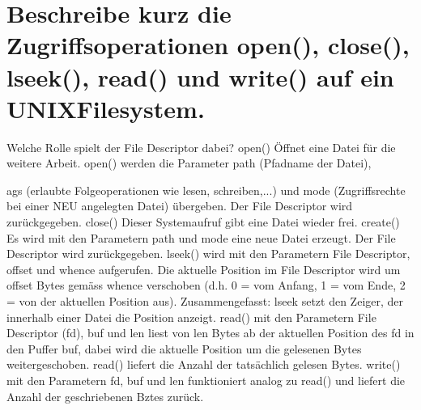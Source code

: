 \documentclass[12pt,a4paper,ngerman]{scrartcl}
\newcommand{\question}[1]{#1}
\newenvironment {answer}
                {}
                {}
\begin{document}
\section{\question{Beschreibe kurz die Zugriffsoperationen open(), close(), lseek(), read() und write() auf ein UNIXFilesystem.}}
\begin{answer}
Welche Rolle spielt der File Descriptor dabei?
open()
Öffnet eine Datei für die weitere Arbeit. open() werden die Parameter path (Pfadname der Datei),

ags (erlaubte Folgeoperationen wie lesen, schreiben,...) und mode (Zugriffsrechte bei einer NEU
angelegten Datei) übergeben. Der File Descriptor wird zurückgegeben.
close()
Dieser Systemaufruf gibt eine Datei wieder frei.
create()
Es wird mit den Parametern path und mode eine neue Datei erzeugt. Der File Descriptor wird
zurückgegeben.
lseek()
wird mit den Parametern File Descriptor, offset und whence aufgerufen. Die aktuelle Position im
File Descriptor wird um offset Bytes gemäss whence verschoben (d.h. 0 = vom Anfang, 1 = vom
Ende, 2 = von der aktuellen Position aus).
Zusammengefasst: lseek setzt den Zeiger, der innerhalb einer Datei die Position anzeigt.
read()
mit den Parametern File Descriptor (fd), buf und len liest von len Bytes ab der aktuellen Position
des fd in den Puffer buf, dabei wird die aktuelle Position um die gelesenen Bytes weitergeschoben.
read() liefert die Anzahl der tatsächlich gelesen Bytes.
write()
mit den Parametern fd, buf und len funktioniert analog zu read() und liefert die Anzahl der geschriebenen
Bztes zurück.
\end{answer}
\end{document}
